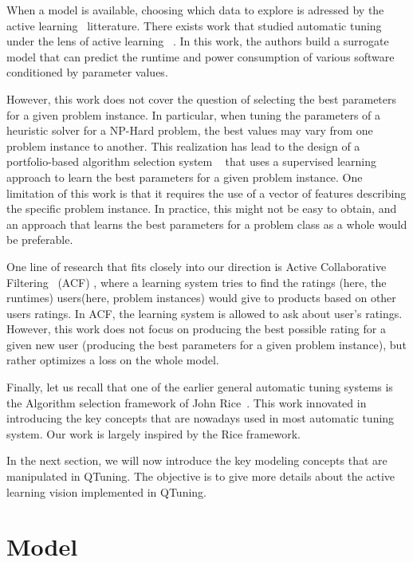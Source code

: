 \documentclass[10pt, conference, compsocconf]{IEEEtran}
\begin{document}
When a model is available, choosing which data to explore is adressed by the
active learning~\cite{DBLP:series/synthesis/2012Settles} litterature.
There exists work that studied automatic tuning under the lens of active learning
~\cite{DBLP:conf/cluster/BalaprakashGW13}. In this work, the authors build a
surrogate model that can predict the runtime and power consumption of various
software conditioned by parameter values.

However, this work does not cover the question of selecting the best parameters
for a given problem instance. In particular, when tuning the parameters of a
heuristic solver for a NP-Hard problem, the best values may vary from one
problem instance to another. This realization has lead to the design of a
portfolio-based algorithm selection system ~\cite{xu2008satzilla} that uses a
supervised learning approach to learn the best parameters for a given problem
instance.  One limitation of this work is that it requires the use of a vector
of features describing the specific problem instance. In practice, this might
not be easy to obtain, and an approach that learns the best parameters for a
problem class as a whole would be preferable.

One line of research that fits closely into our direction is Active
Collaborative Filtering~\cite{DBLP:journals/corr/abs-1212-2442} (ACF) , where a
learning system tries to find the ratings (here, the runtimes) users(here,
problem instances) would give to products based on other users ratings. In ACF,
the learning system is allowed to ask about user's ratings. However, this work
does not focus on producing the best possible rating for a given new user
(producing the best parameters for a given problem instance), but rather
optimizes a loss on the whole model.

Finally, let us recall that one of the earlier general automatic tuning systems
is the  Algorithm selection framework of John Rice~\cite{Rice}. This work
innovated in introducing the key concepts that are nowadays used in most
automatic tuning system. Our work is largely inspired by the Rice framework.

In the next section, we will now introduce the key modeling concepts that are
manipulated in QTuning. The objective is to give more details about the active
learning vision implemented in QTuning.

\section{Model} \label{Model}
\end{document}
